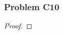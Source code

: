 \documentclass[../../../main.tex]{subfiles}
\begin{document}
\subsubsection{Problem C10}
\begin{wts}

\end{wts}
\begin{proof}

\end{proof}
\end{document}
